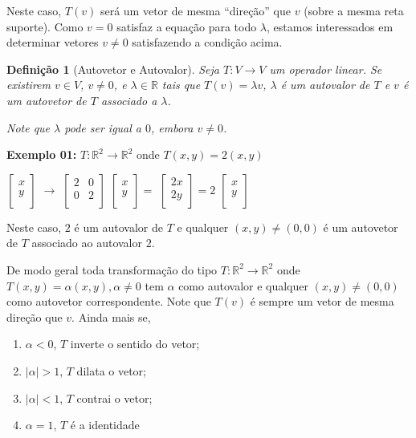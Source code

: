 \documentclass[oneside,a4paper,12pt]{article}
\newtheorem{definition}{Definição}[section]
\begin{document}
Neste caso, $T(v)$ será um vetor de mesma ``direção'' que $v$ (sobre a mesma reta suporte). Como $v = 0$ satisfaz a equação para todo $\lambda$, estamos interessados em determinar vetores $v \neq 0$ satisfazendo a condição acima. 

\begin{definition}[Autovetor e Autovalor]
	Seja $T: V \rightarrow V$ um operador linear. Se existirem $v \in V$, $v \neq 0$, e $\lambda \in \mathbb{R}$ tais que $T(v) = \lambda v$, $\lambda$ é um \emph{autovalor} de $T$ e $v$ é um \emph{autovetor} de $T$ associado a $\lambda$.
	
	Note que $\lambda$ pode ser igual a $0$, embora $v \neq 0$.
\end{definition}

{\bf Exemplo 01: } $T: \mathbb{R}^2 \rightarrow \mathbb{R}^2$ onde $T(x,y) = 2(x,y)$

$\left[
\begin{array}{c}
x\\
y \\
\end{array}
\right]$ $\rightarrow$
$\left[
\begin{array}{cc}
2	&	0\\
0	&	2 \\
\end{array}
\right]$
$\left[
\begin{array}{c}
x\\
y \\
\end{array}
\right] = $
$\left[
\begin{array}{c}
2x\\
2y \\
\end{array}
\right] = 2$
$\left[
\begin{array}{c}
x\\
y \\
\end{array}
\right]$

Neste caso, $2$ é um autovalor de $T$ e qualquer $(x,y) \neq (0,0)$ é um autovetor de $T$ associado ao autovalor $2$.
\vspace{130pt}

De modo geral toda transformação do tipo $T: \mathbb{R}^2 \rightarrow \mathbb{R}^2$ onde $T(x,y) = \alpha(x,y), \alpha \neq 0$
tem $\alpha$ como autovalor e qualquer $(x,y) \neq (0,0)$ como autovetor correspondente. Note que $T(v)$ é sempre um vetor de mesma direção que $v$. Ainda mais se,
\begin{enumerate}
	\item $\alpha < 0$, $T$ inverte o sentido do vetor;
	\item $|\alpha| > 1$, $T$ dilata o vetor;
	\item $|\alpha| < 1$, $T$ contrai o vetor;
	\item $\alpha = 1$, $T$ é a identidade
\end{enumerate}
\end{document}
